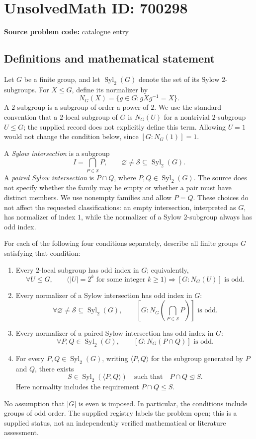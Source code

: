 \documentclass[11pt]{article}
\begin{document}
\section*{UnsolvedMath ID: 700298}
\textbf{Source problem code:} catalogue entry
\subsection{Definitions and mathematical statement}
Let \(G\) be a finite group, and let \(\operatorname{Syl}_2(G)\) denote the set of its Sylow \(2\)-subgroups. For \(X\leq G\), define its normalizer by
\[
N_G(X)=\{g\in G:gXg^{-1}=X\}.
\]
A \(2\)-subgroup is a subgroup of order a power of \(2\). We use the standard convention that a \(2\)-local subgroup of \(G\) is \(N_G(U)\) for a nontrivial \(2\)-subgroup \(U\leq G\); the supplied record does not explicitly define this term. Allowing \(U=1\) would not change the condition below, since \([G:N_G(1)]=1\).

A \emph{Sylow intersection} is a subgroup
\[
I=\bigcap_{P\in\mathcal S}P,
\qquad \varnothing\neq\mathcal S\subseteq\operatorname{Syl}_2(G).
\]
A \emph{paired Sylow intersection} is \(P\cap Q\), where \(P,Q\in\operatorname{Syl}_2(G)\). The source does not specify whether the family may be empty or whether a pair must have distinct members. We use nonempty families and allow \(P=Q\). These choices do not affect the requested classifications: an empty intersection, interpreted as \(G\), has normalizer of index \(1\), while the normalizer of a Sylow \(2\)-subgroup always has odd index.

For each of the following four conditions separately, describe all finite groups \(G\) satisfying that condition:
\begin{enumerate}
\item[(a)] Every \(2\)-local subgroup has odd index in \(G\); equivalently,
\[
\forall U\leq G,\qquad
\bigl(|U|=2^k\text{ for some integer }k\geq1\bigr)
\Longrightarrow [G:N_G(U)]\text{ is odd}.
\]
\item[(b)] Every normalizer of a Sylow intersection has odd index in \(G\):
\[
\forall\varnothing\neq\mathcal S\subseteq\operatorname{Syl}_2(G),\qquad
\left[G:N_G\!\left(\bigcap_{P\in\mathcal S}P\right)\right]\text{ is odd}.
\]
\item[(c)] Every normalizer of a paired Sylow intersection has odd index in \(G\):
\[
\forall P,Q\in\operatorname{Syl}_2(G),\qquad
[G:N_G(P\cap Q)]\text{ is odd}.
\]
\item[(d)] For every \(P,Q\in\operatorname{Syl}_2(G)\), writing \(\langle P,Q\rangle\) for the subgroup generated by \(P\) and \(Q\), there exists
\[
S\in\operatorname{Syl}_2(\langle P,Q\rangle)
\quad\text{such that}\quad P\cap Q\trianglelefteq S.
\]
Here normality includes the requirement \(P\cap Q\leq S\).
\end{enumerate}
No assumption that \(|G|\) is even is imposed. In particular, the conditions include groups of odd order. The supplied registry labels the problem open; this is a supplied status, not an independently verified mathematical or literature assessment.
\end{document}

